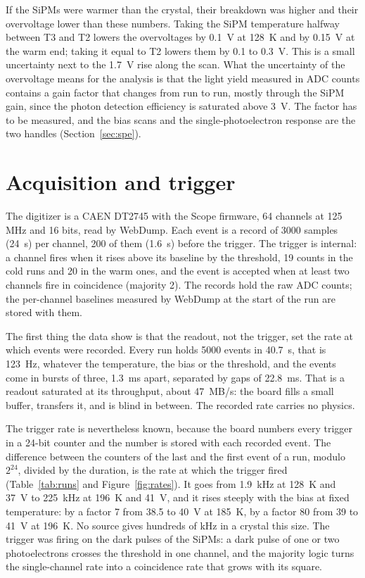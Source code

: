 \documentclass[11pt]{article}
\newcommand{\us}{\textmu s\xspace}
\begin{document}
If the SiPMs were warmer than the crystal, their breakdown was higher and
their overvoltage lower than these numbers. Taking the SiPM temperature
halfway between T3 and T2 lowers the overvoltages by 0.1~V at 128~K and by
0.15~V at the warm end; taking it equal to T2 lowers them by 0.1 to 0.3~V.
This is a small uncertainty next to the 1.7~V rise along the scan. What
the uncertainty of the overvoltage means for the analysis is that the
light yield measured in ADC counts contains a gain factor that changes
from run to run, mostly through the SiPM gain, since the photon detection
efficiency is saturated above 3~V. The factor has to be measured, and the
bias scans and the single-photoelectron response are the two handles
(Section~\ref{sec:spe}).

\section{Acquisition and trigger}
\label{sec:daq}

The digitizer is a CAEN DT2745 with the Scope firmware, 64 channels at 125
MHz and 16 bits, read by WebDump. Each event is a record of 3000 samples
(24~\us) per channel, 200 of them (1.6~\us) before the trigger. The
trigger is internal: a channel fires when it rises above its baseline by
the threshold, 19 counts in the cold runs and 20 in the warm ones, and the
event is accepted when at least two channels fire in coincidence (majority
2). The records hold the raw ADC counts; the per-channel baselines measured
by WebDump at the start of the run are stored with them.

The first thing the data show is that the readout, not the trigger, set
the rate at which events were recorded. Every run holds 5000 events in
40.7~s, that is 123~Hz, whatever the temperature, the bias or the
threshold, and the events come in bursts of three, 1.3~ms apart, separated
by gaps of 22.8~ms. That is a readout saturated at its throughput, about
47~MB/s: the board fills a small buffer, transfers it, and is blind in
between. The recorded rate carries no physics.

The trigger rate is nevertheless known, because the board numbers every
trigger in a 24-bit counter and the number is stored with each recorded
event. The difference between the counters of the last and the first event
of a run, modulo $2^{24}$, divided by the duration, is the rate at which the
trigger fired (Table~\ref{tab:runs} and Figure~\ref{fig:rates}). It goes
from 1.9~kHz at 128~K and 37~V to 225~kHz at 196~K and 41~V, and it rises
steeply with the bias at fixed temperature: by a factor 7 from 38.5 to
40~V at 185~K, by a factor 80 from 39 to 41~V at 196~K. No source gives
hundreds of kHz in a crystal this size. The trigger was firing on the dark
pulses of the SiPMs: a dark pulse of one or two photoelectrons crosses the
threshold in one channel, and the majority logic turns the single-channel
rate into a coincidence rate that grows with its square.
\end{document}
